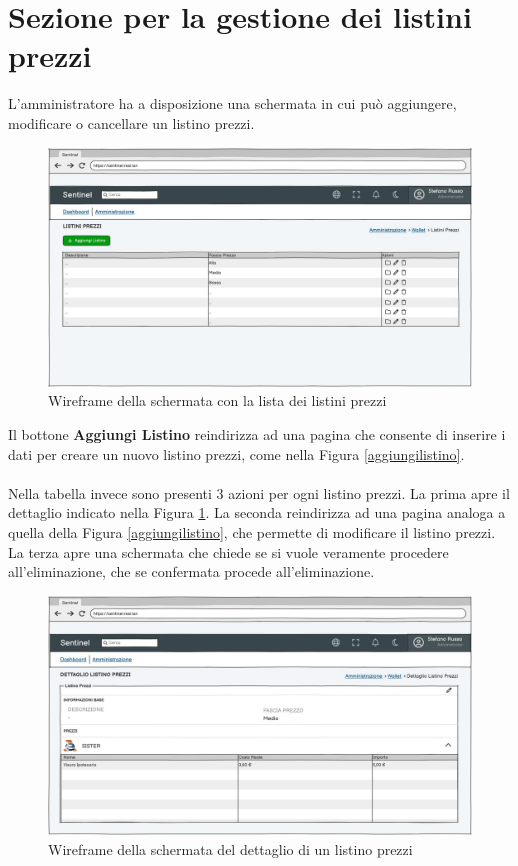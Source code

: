 \section{Sezione per la gestione dei listini prezzi}
L'amministratore ha a disposizione una schermata in cui pu\`o aggiungere, modificare o cancellare un listino prezzi.
\begin{figure}[H]
  \centering
  \includegraphics[width=13cm]{images/gestione-listini/listini-prezzi-list.png}
  \caption{Wireframe della schermata con la lista dei listini prezzi}
\end{figure}
Il bottone \textbf{Aggiungi Listino} reindirizza ad una pagina che consente di inserire i dati per creare un nuovo listino prezzi, come nella Figura \ref{aggiungilistino}.
\\\\
Nella tabella invece sono presenti 3 azioni per ogni listino prezzi.
La prima apre il dettaglio indicato nella Figura \ref{dettagliolistino}.
La seconda reindirizza ad una pagina analoga a quella della Figura \ref{aggiungilistino}, che permette di modificare il listino prezzi.
La terza apre una schermata che chiede se si vuole veramente procedere all'eliminazione, che se confermata procede all'eliminazione.
\begin{figure}[H]
  \centering
  \includegraphics[width=13cm]{images/gestione-listini/dettaglio-listino.png}
  \caption{Wireframe della schermata del dettaglio di un listino prezzi}
  \label{dettagliolistino}
\end{figure}

